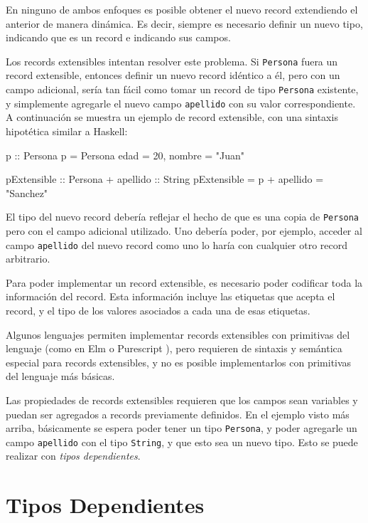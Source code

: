 En ninguno de ambos enfoques es posible obtener el nuevo record extendiendo el anterior de manera dinámica. Es decir, siempre es necesario definir un nuevo tipo, indicando que es un record e indicando sus campos.

Los records extensibles intentan resolver este problema. Si \texttt{Persona} fuera un record extensible, entonces definir un nuevo record idéntico a él, pero con un campo adicional, sería tan fácil como tomar un record de tipo \texttt{Persona} existente, y simplemente agregarle el nuevo campo \texttt{apellido} con su valor correspondiente. A continuación se muestra un ejemplo de record extensible, con una sintaxis hipotética similar a Haskell:

\begin{code}
p :: Persona
p = Persona { edad = 20, nombre = "Juan" }

pExtensible :: Persona + { apellido :: String }
pExtensible = p + { apellido = "Sanchez" }
\end{code}

El tipo del nuevo record debería reflejar el hecho de que es una copia de \texttt{Persona} pero con el campo adicional utilizado. Uno debería poder, por ejemplo, acceder al campo \texttt{apellido} del nuevo record como uno lo haría con cualquier otro record arbitrario.

Para poder implementar un record extensible, es necesario poder codificar toda la información del record. Esta información incluye las etiquetas que acepta el record, y el tipo de los valores asociados a cada una de esas etiquetas. 

Algunos lenguajes permiten implementar records extensibles con primitivas del lenguaje (como en Elm \cite{ElmRecords} o Purescript \cite{PurescriptRecords}), pero requieren de sintaxis y semántica especial para records extensibles, y no es posible implementarlos con primitivas del lenguaje más básicas. 

Las propiedades de records extensibles requieren que los campos sean variables y puedan ser agregados a records previamente definidos. En el ejemplo visto más arriba, básicamente se espera poder tener un tipo \texttt{Persona}, y poder agregarle un campo \texttt{apellido} con el tipo \texttt{String}, y que esto sea un nuevo tipo. Esto se puede realizar con \textit{tipos dependientes}.

\section{Tipos Dependientes}

